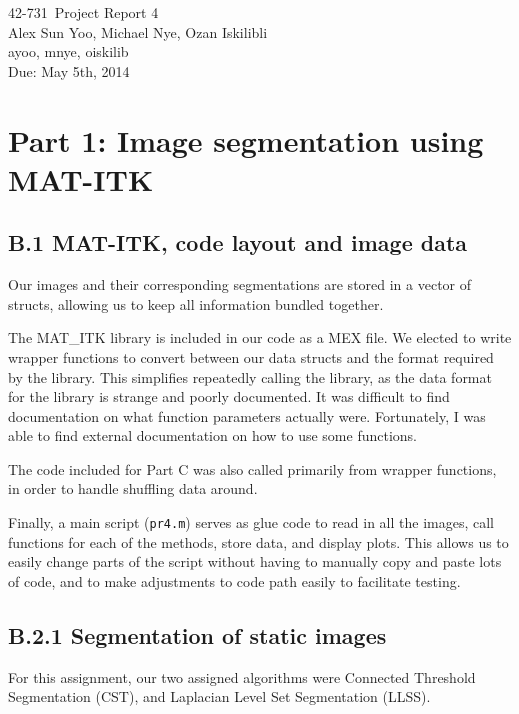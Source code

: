 \documentclass{article}
\newcommand{\hmwkTitle}{Project Report 4}
\newcommand{\hmwkDueDate}{May 5th, 2014}
\newcommand{\hmwkClass}{42-731}
\newcommand{\hmwkAuthor}{Alex Sun Yoo, Michael Nye, Ozan Iskilibli}
\newcommand{\hmwkEmail}{ayoo, mnye, oiskilib}
\newcommand{\hmwkCollaborators}{}
\begin{document}
\thispagestyle{plain}
\begin{center}
{\Large \hmwkClass\ \hmwkTitle} \\
\hmwkAuthor \\
\hmwkEmail \\
\ifthenelse{\equal{\hmwkCollaborators}{}}{}{Collaborators: \hmwkCollaborators\\}
Due: \hmwkDueDate\\
\end{center}

\section*{Part 1: Image segmentation using MAT-ITK}

\subsection*{B.1 MAT-ITK, code layout and image data}

Our images and their corresponding segmentations are stored in a vector of structs, allowing us to keep all information bundled together.

The MAT\_ITK library is included in our code as a MEX file. We elected to write wrapper functions to convert between our data structs and the format required by the library. This simplifies repeatedly calling the library, as the data format for the library is strange and poorly documented. It was difficult to find documentation on what function parameters actually were. Fortunately, I was able to find external documentation on how to use some functions\cite{designest}.

The code included for Part C was also called primarily from wrapper functions, in order to handle shuffling data around.

Finally, a main script (\texttt{pr4.m}) serves as glue code to read in all the images, call functions for each of the methods, store data, and display plots. This allows us to easily change parts of the script without having to manually copy and paste lots of code, and to make adjustments to code path easily to facilitate testing.


\subsection*{B.2.1 Segmentation of static images}

For this assignment, our two assigned algorithms were Connected Threshold Segmentation (CST), and Laplacian Level Set Segmentation (LLSS).
\end{document}
